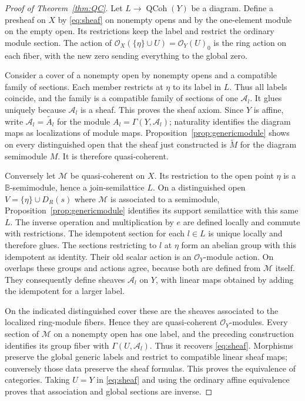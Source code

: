 \documentclass[11pt]{amsart}
\newcommand{\B}{\mathbb B}
\newcommand{\Qcoh}{\operatorname{QCoh}}
\theoremstyle{definition}
\theoremstyle{remark}
\begin{document}
\begin{proof}[Proof of Theorem~\ref{thm:QC}]
Let $L\to\Qcoh(Y)$ be a diagram. Define a presheaf on $X$ by \eqref{eq:sheaf} on nonempty opens and by the one-element module on the empty open. Its restrictions keep the label and restrict the ordinary module section. The action of $\mathcal O_X(\{\eta\}\cup U)=\mathcal O_Y(U)_0$ is the ring action on each fiber, with the new zero sending everything to the global zero.

Consider a cover of a nonempty open by nonempty opens and a compatible family of sections. Each member restricts at $\eta$ to its label in $L$. Thus all labels coincide, and the family is a compatible family of sections of one $\mathcal A_l$. It glues uniquely because $\mathcal A_l$ is a sheaf. This proves the sheaf axiom. Since $Y$ is affine, write $\mathcal A_l=\widetilde{A_l}$ for the module $A_l=\Gamma(Y,\mathcal A_l)$; naturality identifies the diagram maps as localizations of module maps. Proposition~\ref{prop:genericmodule} shows on every distinguished open that the sheaf just constructed is $\widetilde{M}$ for the diagram semimodule $M$. It is therefore quasi-coherent.

Conversely let $\mathcal M$ be quasi-coherent on $X$. Its restriction to the open point $\eta$ is a $\B$-semimodule, hence a join-semilattice $L$. On a distinguished open $V=\{\eta\}\cup D_R(s)$ where $\mathcal M$ is associated to a semimodule, Proposition~\ref{prop:genericmodule} identifies its support semilattice with this same $L$. The inverse operation and multiplication by $e$ are defined locally and commute with restrictions. The idempotent section for each $l\in L$ is unique locally and therefore glues. The sections restricting to $l$ at $\eta$ form an abelian group with this idempotent as identity. Their old scalar action is an $\mathcal O_Y$-module action. On overlaps these groups and actions agree, because both are defined from $\mathcal M$ itself. They consequently define sheaves $\mathcal A_l$ on $Y$, with linear maps obtained by adding the idempotent for a larger label.

On the indicated distinguished cover these are the sheaves associated to the localized ring-module fibers. Hence they are quasi-coherent $\mathcal O_Y$-modules. Every section of $\mathcal M$ on a nonempty open has one label, and the preceding construction identifies its group fiber with $\Gamma(U,\mathcal A_l)$. Thus it recovers \eqref{eq:sheaf}. Morphisms preserve the global generic labels and restrict to compatible linear sheaf maps; conversely those data preserve the sheaf formulas. This proves the equivalence of categories. Taking $U=Y$ in \eqref{eq:sheaf} and using the ordinary affine equivalence proves that association and global sections are inverse.
\end{proof}
\end{document}
